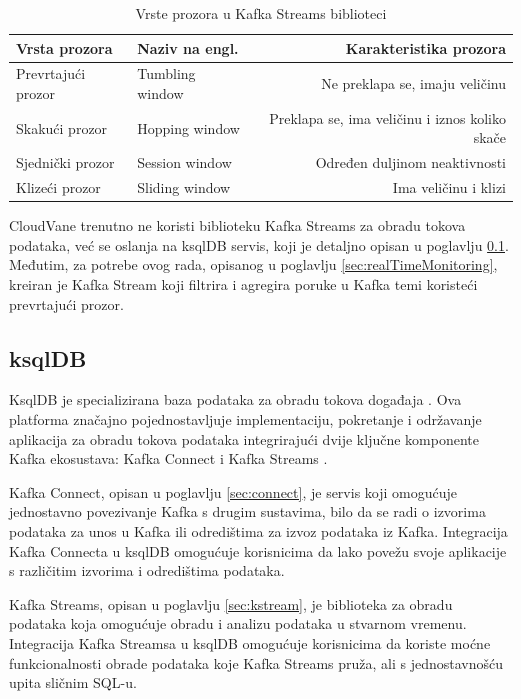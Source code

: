 \documentclass[times, utf8, diplomski]{fer}
\begin{document}
\begin{table}[htb]
\caption{Vrste prozora u Kafka Streams biblioteci}
\label{tbl:windows}
\centering
\begin{tabular}{l|l|r} \toprule
Vrsta prozora & Naziv na engl. & Karakteristika prozora \\ \midrule
Prevrtajući prozor & Tumbling window & Ne preklapa se, imaju veličinu\\
Skakući prozor & Hopping window & Preklapa se, ima veličinu i iznos koliko skače\\
Sjednički prozor & Session window & Određen duljinom neaktivnosti\\
Klizeći prozor & Sliding window & Ima veličinu i klizi \\ \bottomrule
\end{tabular}
\end{table} 

CloudVane trenutno ne koristi biblioteku Kafka Streams za obradu tokova podataka, već se oslanja na ksqlDB servis, koji je detaljno opisan u poglavlju \ref{sec:ksql}. Međutim, za potrebe ovog rada, opisanog u poglavlju \ref{sec:realTimeMonitoring}, kreiran je Kafka Stream koji filtrira i agregira poruke u Kafka temi koristeći prevrtajući prozor.

\clearpage
\subsection{ksqlDB}
\label{sec:ksql}

KsqlDB je specializirana baza podataka za obradu tokova događaja . Ova platforma značajno pojednostavljuje implementaciju, pokretanje i održavanje aplikacija za obradu tokova podataka integrirajući dvije ključne komponente Kafka ekosustava: Kafka Connect i Kafka Streams \citep{seymour_mastering_2021}.

Kafka Connect, opisan u poglavlju \ref{sec:connect}, je servis koji omogućuje jednostavno povezivanje Kafka s drugim sustavima, bilo da se radi o izvorima podataka za unos u Kafka ili odredištima za izvoz podataka iz Kafka. Integracija Kafka Connecta u ksqlDB omogućuje korisnicima da lako povežu svoje aplikacije s različitim izvorima i odredištima podataka.

Kafka Streams, opisan u poglavlju \ref{sec:kstream}, je biblioteka za obradu podataka koja omogućuje obradu i analizu podataka u stvarnom vremenu. Integracija Kafka Streamsa u ksqlDB omogućuje korisnicima da koriste moćne funkcionalnosti obrade podataka koje Kafka Streams pruža, ali s jednostavnošću upita sličnim SQL-u.
\end{document}
